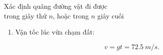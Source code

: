 \begin{dang}{Xác định quãng đường vật đi được \\trong giây thứ $n$, hoặc trong $n$ giây cuối}
{\begin{enumerate}[label=\alph*.]
			Quãng đường vật rơi trong $t$ giây: 
			$$s = \dfrac{1}{2}gt^2.$$
			
			Quãng đường vật rơi trong ($t - 2$) giây: 
			$$s_1 =\dfrac{1}{2}g(t-2)^2.$$
			
			Quãng đường vật rơi trong 5 giây đầu tiên: 
			$$s_5 = \dfrac{1}{2}gt_5^2.$$
			
			Quãng đường vật rơi trong 2 giây cuối: 
			$$s_2 = s - s_1 = s_5 \quad\Leftrightarrow\quad  \dfrac{1}{2}gt^2 - \dfrac{1}{2}g(t-2)^2 = \dfrac{1}{2}gt_5^2 \quad\Rightarrow\quad t = \SI{7,25}{s}.$$
			
			Độ cao lúc thả vật:
			$$s = \dfrac{1}{2}gt^2= \SI{262,81}{m}.$$
			\item  Vận tốc lúc vừa chạm đất:
			
			$$v = gt = \SI{72,5}{m/s}.$$
		\end{enumerate}
	}
	
\end{dang}
